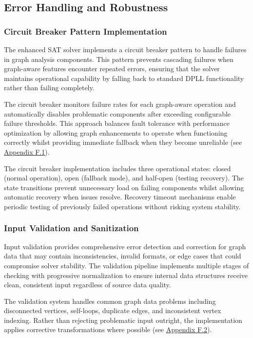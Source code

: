 \subsection{Error Handling and Robustness}

\subsubsection{Circuit Breaker Pattern Implementation}

The enhanced SAT solver implements a circuit breaker pattern to handle failures in graph analysis components. This pattern prevents cascading failures when graph-aware features encounter repeated errors, ensuring that the solver maintains operational capability by falling back to standard DPLL functionality rather than failing completely.

The circuit breaker monitors failure rates for each graph-aware operation and automatically disables problematic components after exceeding configurable failure thresholds. This approach balances fault tolerance with performance optimization by allowing graph enhancements to operate when functioning correctly whilst providing immediate fallback when they become unreliable (see \hyperref[appendix:circuit-breaker]{Appendix F.1}).

The circuit breaker implementation includes three operational states: closed (normal operation), open (fallback mode), and half-open (testing recovery). The state transitions prevent unnecessary load on failing components whilst allowing automatic recovery when issues resolve. Recovery timeout mechanisms enable periodic testing of previously failed operations without risking system stability.

\subsubsection{Input Validation and Sanitization}

Input validation provides comprehensive error detection and correction for graph data that may contain inconsistencies, invalid formats, or edge cases that could compromise solver stability. The validation pipeline implements multiple stages of checking with progressive normalization to ensure internal data structures receive clean, consistent input regardless of source data quality.

The validation system handles common graph data problems including disconnected vertices, self-loops, duplicate edges, and inconsistent vertex indexing. Rather than rejecting problematic input outright, the implementation applies corrective transformations where possible (see \hyperref[appendix:input-validation]{Appendix F.2}).

